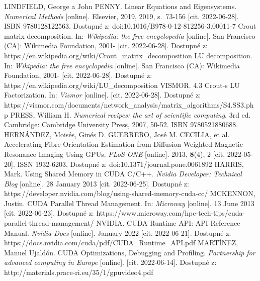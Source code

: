 \clearpage  							   	 %

\begin{thebibliography}{38}
	
	LINDFIELD, George a John PENNY. Linear Equations and Eigensystems. \textit{Numerical Methods} [online]. Elsevier, 2019, 2019, s.~73-156 [cit. 2022-06-28]. ISBN 9780128122563. Dostupné z: doi:10.1016/B978-0-12-812256-3.00011-7
	Crout matrix decomposition. In: \textit{Wikipedia: the free encyclopedia} [online]. San Francisco (CA): Wikimedia Foundation, 2001- [cit. 2022-06-28]. Dostupné z: https://en.wikipedia.org/wiki/Crout\_matrix\_decomposition
	LU decomposition. In: \textit{Wikipedia: the free encyclopedia} [online]. San Francisco (CA): Wikimedia Foundation, 2001- [cit. 2022-06-28]. Dostupné z: https://en.wikipedia.org/wiki/LU\_decomposition
	VISMOR. 4.3 Crout-s LU Factorization. In: \textit{Vismor} [online]. [cit. 2022-06-28]. Dostupné z: https://vismor.com/documents/network\_analysis/matrix\_algorithms/S4.SS3.php
	PRESS, William H. \textit{Numerical recipes: the art of scientific computing}. 3rd ed. Cambridge: Cambridge University Press, 2007, 50-52. ISBN 9780521880688.
	HERNÁNDEZ, Moisés, Ginés D. GUERRERO, José M. CECILIA, et al. Accelerating Fibre Orientation Estimation from Diffusion Weighted Magnetic Resonance Imaging Using GPUs. \textit{PLoS ONE} [online]. 2013, \textbf{8}(4), 2 [cit. 2022-05-20]. ISSN 1932-6203. Dostupné z: doi:10.1371/journal.pone.0061892
	HARRIS, Mark. Using Shared Memory in CUDA C/C++. \textit{Nvidia Developer: Technical Blog} [online]. 28 January 2013 [cit. 2022-06-25]. Dostupné z: https://developer.nvidia.com/blog/using-shared-memory-cuda-cc/
	MCKENNON, Justin. CUDA Parallel Thread Management. In: \textit{Microway} [online]. 13 June 2013 [cit. 2022-06-23]. Dostupné z: https://www.microway.com/hpc-tech-tips/cuda-parallel-thread-management/
	NVIDIA. CUDA Runtime API: API Reference Manual. \textit{Nvidia Docs} [online]. January 2022 [cit. 2022-06-21]. Dostupné z: https://docs.nvidia.com/cuda/pdf/CUDA\_Runtime\_API.pdf
	MARTÍNEZ, Manuel Ujaldón. CUDA Optimizations, Debugging and Profiling. \textit{Partnership for advanced computing in Europe} [online]. [cit. 2022-06-14]. Dostupné z: http://materials.prace-ri.eu/35/1/gpuvideo4.pdf

\end{thebibliography}
